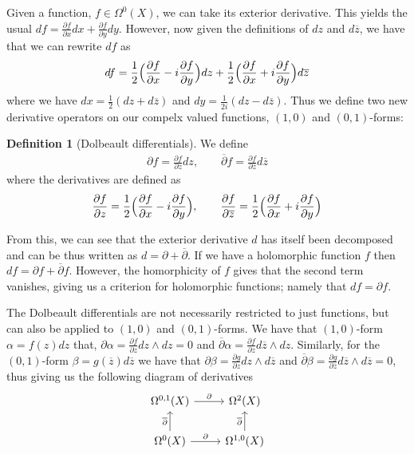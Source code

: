 \documentclass[11pt]{report}
\theoremstyle{definition}
\newtheorem{defn}[thm]{Definition}
\begin{document}
Given a function, $f \in \Omega^0(X)$, we can take its exterior derivative. This yields the usual $df = \frac{\partial f}{\partial x}dx + \frac{\partial f}{\partial y}dy$. However, now given the definitions of $dz$ and $d\overline{z}$, we have that we can rewrite $df$ as 
\[ 
  df = \frac{1}{2}\Bigl(\frac{\partial f}{\partial x} - i\frac{\partial f}{\partial y}\Bigr)dz + \frac{1}{2}\Bigl(\frac{\partial f}{\partial x} + i\frac{\partial f}{\partial y}\Bigr)d\overline{z} 
\]
where we have  $dx = \frac{1}{2}(dz+d\overline{z})$ and $dy = \frac{1}{2i}(dz - d\overline{z})$. Thus we define two new derivative operators on our compelx valued functions, $(1,0)$ and $(0,1)$-forms:
\begin{defn}[Dolbeault differentials]
  We define 
  \begin{align*} 
    \partial f = \frac{\partial f}{\partial z}dz, 
    \qquad 
    \overline{\partial}f = \frac{\partial f}{\partial \overline{z}}d\overline{z}
  \end{align*}
  where the derivatives are defined as \[
  \frac{\partial f}{\partial z} = \frac{1}{2}\Bigl(\frac{\partial f}{\partial x} - i\frac{\partial f}{\partial y}\Bigr), 
  \qquad 
  \frac{\partial f}{\partial \overline{z}} = \frac{1}{2}\Bigl(\frac{\partial f}{\partial x} + i\frac{\partial f}{\partial y}\Bigr)\]
\end{defn}

From this, we can see that the exterior derivative $d$ has itself been decomposed and can be thus written as $d = \partial + \overline{\partial}$. If we have a holomorphic function $f$ then $df = \partial f + \overline{\partial} f$. However, the homorphicity of $f$ gives that the second term vanishes, giving us a criterion for holomorphic functions; namely that $df = \partial f$.

The Dolbeault differentials are not necessarily restricted to just functions, but can also be applied to $(1,0)$ and $(0,1)$-forms. We have that $(1,0)$-form $\alpha = f(z)dz$ that, $\partial\alpha = \frac{\partial f}{\partial z}dz \wedge dz = 0$ and $\overline{\partial}\alpha = \frac{\partial f}{\partial z}d\overline{z} \wedge dz$. Similarly, for the $(0,1)$-form $\beta = g(\overline{z})d\overline{z}$ we have that $\partial\beta = \frac{\partial g}{\partial z}dz \wedge d\overline{z}$ and $\overline{\partial}\beta = \frac{\partial g}{\partial \overline{z}}d\overline{z}\wedge d\overline{z}=0$, thus giving us the following diagram of derivatives
\[
  \begin{tikzcd}
    \Omega^{0,1}(X) \arrow{r}{\partial} & \Omega^2(X) \\
    \Omega^0(X) \arrow{r}{\partial}  \arrow{u}{\overline{\partial}} & \Omega^{1,0}(X) \arrow{u}{\overline{\partial}}
  \end{tikzcd}  
\]
\end{document}
